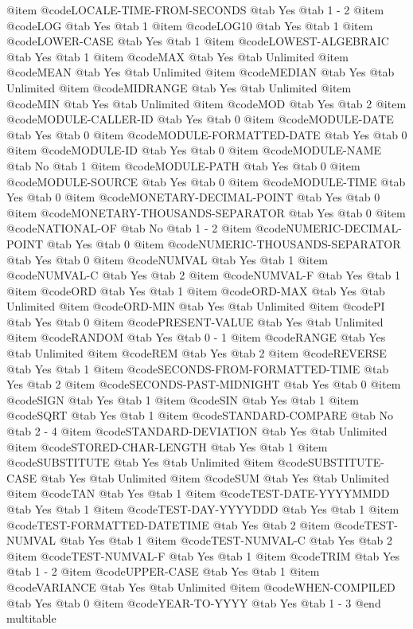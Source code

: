 @item @code{LOCALE-TIME-FROM-SECONDS} @tab Yes @tab 1 - 2
@item @code{LOG} @tab Yes @tab 1
@item @code{LOG10} @tab Yes @tab 1
@item @code{LOWER-CASE} @tab Yes @tab 1
@item @code{LOWEST-ALGEBRAIC} @tab Yes @tab 1
@item @code{MAX} @tab Yes @tab Unlimited
@item @code{MEAN} @tab Yes @tab Unlimited
@item @code{MEDIAN} @tab Yes @tab Unlimited
@item @code{MIDRANGE} @tab Yes @tab Unlimited
@item @code{MIN} @tab Yes @tab Unlimited
@item @code{MOD} @tab Yes @tab 2
@item @code{MODULE-CALLER-ID} @tab Yes @tab 0
@item @code{MODULE-DATE} @tab Yes @tab 0
@item @code{MODULE-FORMATTED-DATE} @tab Yes @tab 0
@item @code{MODULE-ID} @tab Yes @tab 0
@item @code{MODULE-NAME} @tab No @tab 1
@item @code{MODULE-PATH} @tab Yes @tab 0
@item @code{MODULE-SOURCE} @tab Yes @tab 0
@item @code{MODULE-TIME} @tab Yes @tab 0
@item @code{MONETARY-DECIMAL-POINT} @tab Yes @tab 0
@item @code{MONETARY-THOUSANDS-SEPARATOR} @tab Yes @tab 0
@item @code{NATIONAL-OF} @tab No @tab 1 - 2
@item @code{NUMERIC-DECIMAL-POINT} @tab Yes @tab 0
@item @code{NUMERIC-THOUSANDS-SEPARATOR} @tab Yes @tab 0
@item @code{NUMVAL} @tab Yes @tab 1
@item @code{NUMVAL-C} @tab Yes @tab 2
@item @code{NUMVAL-F} @tab Yes @tab 1
@item @code{ORD} @tab Yes @tab 1
@item @code{ORD-MAX} @tab Yes @tab Unlimited
@item @code{ORD-MIN} @tab Yes @tab Unlimited
@item @code{PI} @tab Yes @tab 0
@item @code{PRESENT-VALUE} @tab Yes @tab Unlimited
@item @code{RANDOM} @tab Yes @tab 0 - 1
@item @code{RANGE} @tab Yes @tab Unlimited
@item @code{REM} @tab Yes @tab 2
@item @code{REVERSE} @tab Yes @tab 1
@item @code{SECONDS-FROM-FORMATTED-TIME} @tab Yes @tab 2
@item @code{SECONDS-PAST-MIDNIGHT} @tab Yes @tab 0
@item @code{SIGN} @tab Yes @tab 1
@item @code{SIN} @tab Yes @tab 1
@item @code{SQRT} @tab Yes @tab 1
@item @code{STANDARD-COMPARE} @tab No @tab 2 - 4
@item @code{STANDARD-DEVIATION} @tab Yes @tab Unlimited
@item @code{STORED-CHAR-LENGTH} @tab Yes @tab 1
@item @code{SUBSTITUTE} @tab Yes @tab Unlimited
@item @code{SUBSTITUTE-CASE} @tab Yes @tab Unlimited
@item @code{SUM} @tab Yes @tab Unlimited
@item @code{TAN} @tab Yes @tab 1
@item @code{TEST-DATE-YYYYMMDD} @tab Yes @tab 1
@item @code{TEST-DAY-YYYYDDD} @tab Yes @tab 1
@item @code{TEST-FORMATTED-DATETIME} @tab Yes @tab 2
@item @code{TEST-NUMVAL} @tab Yes @tab 1
@item @code{TEST-NUMVAL-C} @tab Yes @tab 2
@item @code{TEST-NUMVAL-F} @tab Yes @tab 1
@item @code{TRIM} @tab Yes @tab 1 - 2
@item @code{UPPER-CASE} @tab Yes @tab 1
@item @code{VARIANCE} @tab Yes @tab Unlimited
@item @code{WHEN-COMPILED} @tab Yes @tab 0
@item @code{YEAR-TO-YYYY} @tab Yes @tab 1 - 3
@end multitable
